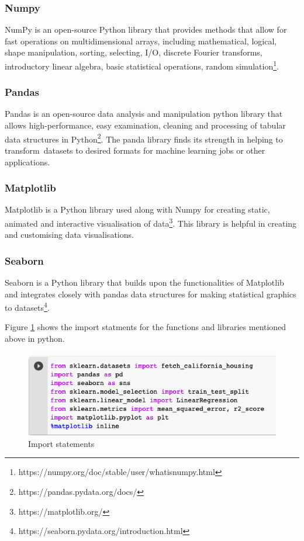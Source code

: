 \documentclass[conference]{IEEEtran}
\begin{document}
\subsubsection{Numpy}
NumPy is an open-source Python library that provides methods that allow for fast operations on multidimensional arrays, including mathematical, logical, shape manipulation, sorting, selecting, I/O, discrete Fourier transforms, introductory linear algebra, basic statistical operations, random simulation\footnote{https://numpy.org/doc/stable/user/whatisnumpy.html}.
\subsubsection{Pandas}
Pandas is an open-source data analysis and manipulation python library that allows high-performance, easy examination, cleaning and processing of tabular data structures in Python\footnote{https://pandas.pydata.org/docs/}. The panda library finds its strength in helping to transform datasets to desired formats for machine learning jobs or other applications.
\subsubsection{Matplotlib}
Matplotlib is a Python library used along with Numpy for creating static, animated and interactive visualisation of data\footnote{https://matplotlib.org/}. This library is helpful in creating and customising data visualisations.
\subsubsection{Seaborn}
Seaborn is a Python library that builds upon the functionalities of Matplotlib and integrates closely with pandas data structures for making statistical graphics to datasets\footnote{https://seaborn.pydata.org/introduction.html}.

 Figure \ref{fig:placeholder} shows the import statments for the functions and libraries mentioned above in python.
 \begin{figure}[htbp]
	\centerline{\includegraphics [scale=0.45]{figures/import_statements.png}}
	\caption{Import statements}
	\label{fig:placeholder}
\end{figure}
\end{document}
